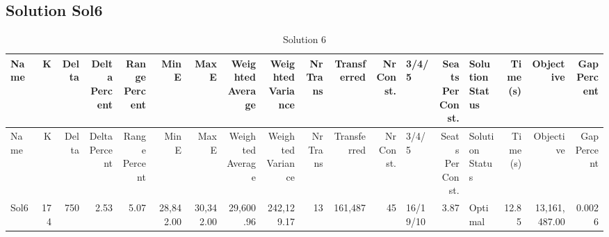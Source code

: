 \documentclass[a4paper]{article}
\begin{document}
\clearpage
\subsection{Solution Sol6}

{\scriptsize
\begin{longtable}{lrrrrrrrrrrrlrlrrr}
\caption{Solution 6}
\\ \toprule
Name &K &Delta &\shortstack{Delta\\Percent} &\shortstack{Range\\Percent} &Min E &Max E &\shortstack{Weighted\\Average} &\shortstack{Weighted\\Variance} &\shortstack{Nr\\Trans} &Transferred &\shortstack{Nr\\Const.} &3/4/5 &\shortstack{Seats\\Per\\Const.} &\shortstack{Solution\\Status} &\shortstack{Time\\(s)} &Objective &\shortstack{Gap\\Percent} \\ \midrule
\endfirsthead
\toprule
Name &K &Delta &\shortstack{Delta\\Percent} &\shortstack{Range\\Percent} &Min E &Max E &\shortstack{Weighted\\Average} &\shortstack{Weighted\\Variance} &\shortstack{Nr\\Trans} &Transferred &\shortstack{Nr\\Const.} &3/4/5 &\shortstack{Seats\\Per\\Const.} &\shortstack{Solution\\Status} &\shortstack{Time\\(s)} &Objective &\shortstack{Gap\\Percent} \\ \midrule
\endhead
\bottomrule
\endfoot
Sol6&174&750& 2.53& 5.07&28,842.00&30,342.00&29,600.96&242,129.17&13&161,487&45&16/19/10& 3.87&Optimal&12.85&13,161,487.00&0.0026\\ 
\end{longtable}

}
\end{document}
